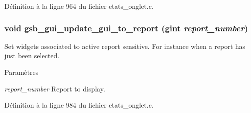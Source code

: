 Définition à la ligne 964 du fichier etats\_\-onglet.c.

\subsubsection[{gsb\_\-gui\_\-update\_\-gui\_\-to\_\-report}]{\setlength{\rightskip}{0pt plus 5cm}void gsb\_\-gui\_\-update\_\-gui\_\-to\_\-report (gint {\em report\_\-number})}\label{etats__onglet_8h_a45fec3aed31acd90ea946bd3eab8586e}
Set widgets associated to active report sensitive. For instance when a report has just been selected.


\begin{DoxyParams}{Paramètres}
\item[{\em report\_\-number}]Report to display. \end{DoxyParams}


Définition à la ligne 984 du fichier etats\_\-onglet.c.

